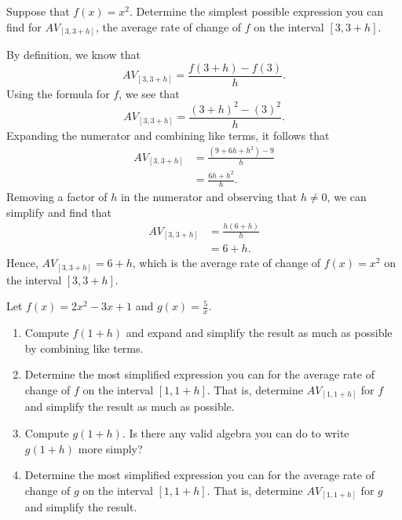 \documentclass{ximera}
\begin{document}
\begin{example}
Suppose that $f(x) = x^2$.  Determine the simplest possible expression you can find for $AV_{[3,3+h]}$, the average rate of change of $f$ on the interval $[3,3+h]$.

\begin{explanation}
By definition, we know that%
\begin{equation*}
AV_{[3,3+h]} = \frac{f(3+h)-f(3)}{h}.
\end{equation*}
Using the formula for $f$, we see that%
\begin{equation*}
AV_{[3,3+h]} = \frac{(3+h)^2-(3)^2}{h}.
\end{equation*}
Expanding the numerator and combining like terms, it follows that%
\begin{align*}
AV_{[3,3+h]} &= \frac{(9+6h+h^2)-9}{h}\\
&= \frac{6h + h^2}{h}\text{.}
\end{align*}
Removing a factor of $h$ in the numerator and observing that $h \ne 0$, we can simplify and find that%
\begin{align*}
AV_{[3,3+h]} &= \frac{h(6 + h)}{h}\\
&= 6+h\text{.}
\end{align*}
Hence, $AV_{[3,3+h]} = 6+h$, which is the average rate of change of $f(x) = x^2$ on the interval $[3,3+h]$.  
\end{explanation}

\end{example}

\begin{exploration}
Let $f(x) = 2x^2 - 3x + 1$ and $g(x) = \frac{5}{x}$.%
\begin{enumerate}[label=\alph*.]
\item Compute $f(1+h)$ and expand and simplify the result as much as possible by combining like terms.
\item Determine the most simplified expression you can for the average rate of change of $f$ on the interval $[1,1+h]$. That is, determine $AV_{[1,1+h]}$ for $f$ and simplify the result as much as possible.
\item Compute $g(1+h)$. Is there any valid algebra you can do to write $g(1+h)$ more simply?
\item Determine the most simplified expression you can for the average rate of change of $g$ on the interval $[1,1+h]$. That is, determine $AV_{[1,1+h]}$ for $g$ and simplify the result.
\end{enumerate}
\end{exploration}
\end{document}
